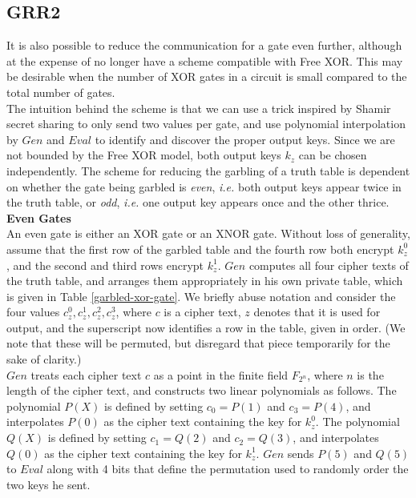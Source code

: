 \documentclass{article}
\begin{document}
\subsection{GRR2}
It is also possible to reduce the communication for a gate even further, although at the expense of no longer have a scheme compatible with Free XOR. This may be desirable when the number of XOR gates in a circuit is small compared to the total number of gates. \\

The intuition behind the scheme is that we can use a trick inspired by Shamir secret sharing to only send two values per gate, and use polynomial interpolation by $Gen$ and $Eval$ to identify and discover the proper output keys. Since we are not bounded by the Free XOR model, both output keys $k_z$ can be chosen independently. The scheme for reducing the garbling of a truth table is dependent on whether the gate being garbled is \textit{even}, \textit{i.e.} both output keys appear twice in the truth table, or \textit{odd}, \textit{i.e.} one output key appears once and the other thrice.\\
 
\textbf{Even Gates}\\
An even gate is either an XOR gate or an XNOR gate. Without loss of generality, assume that the first row of the garbled table and the fourth row both encrypt $k_z^0$, and the second and third rows encrypt $k_z^1$. $Gen$ computes all four cipher texts of the truth table, and arranges them appropriately in his own private table, which is given in Table \ref{garbled-xor-gate}. We briefly abuse notation and consider the four values $c_z^{0},c_z^{1},c_z^{2},c_z^{3}$, where $c$ is a cipher text, $z$ denotes that it is used for output, and the superscript now identifies a row in the table, given in order. (We note that these will be permuted, but disregard that piece temporarily for the sake of clarity.)\\

$Gen$ treats each cipher text $c$ as a point in the finite field $F_{2^n}$, where $n$ is the length of the cipher text, and constructs two linear polynomials as follows. The polynomial $P(X)$ is defined by setting $c_0 = P(1)$ and $c_3 = P(4)$, and interpolates $P(0)$ as the cipher text containing the key for $k_z^0$. The polynomial $Q(X)$ is defined by setting $c_1 = Q(2)$ and $c_2 = Q(3)$, and interpolates $Q(0)$ as the cipher text containing the key for $k_z^1$. $Gen$ sends $P(5)$ and $Q(5)$ to $Eval$ along with 4 bits that define the permutation used to randomly order the two keys he sent.\\
\end{document}
